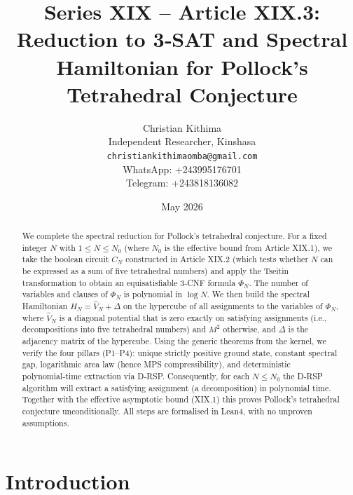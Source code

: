 \documentclass[11pt,a4paper]{article}
\title{Series XIX – Article XIX.3: Reduction to 3‑SAT and Spectral Hamiltonian for Pollock's Tetrahedral Conjecture}
\author{Christian Kithima \\
Independent Researcher, Kinshasa \\
\texttt{christiankithimaomba@gmail.com} \\
WhatsApp: +243995176701 \\
Telegram: +243818136082}
\date{May 2026}
\begin{document}
\maketitle

\begin{abstract}
We complete the spectral reduction for Pollock's tetrahedral conjecture. For a fixed integer \(N\) with \(1\le N\le N_0\) (where \(N_0\) is the effective bound from Article XIX.1), we take the boolean circuit \(C_N\) constructed in Article XIX.2 (which tests whether \(N\) can be expressed as a sum of five tetrahedral numbers) and apply the Tseitin transformation to obtain an equisatisfiable 3‑CNF formula \(\Phi_N\). The number of variables and clauses of \(\Phi_N\) is polynomial in \(\log N\). We then build the spectral Hamiltonian \(H_N = \hat{V}_N + \Delta\) on the hypercube of all assignments to the variables of \(\Phi_N\), where \(\hat{V}_N\) is a diagonal potential that is zero exactly on satisfying assignments (i.e., decompositions into five tetrahedral numbers) and \(M^2\) otherwise, and \(\Delta\) is the adjacency matrix of the hypercube. Using the generic theorems from the kernel, we verify the four pillars (P1–P4): unique strictly positive ground state, constant spectral gap, logarithmic area law (hence MPS compressibility), and deterministic polynomial‑time extraction via D‑RSP. Consequently, for each \(N\le N_0\) the D‑RSP algorithm will extract a satisfying assignment (a decomposition) in polynomial time. Together with the effective asymptotic bound (XIX.1) this proves Pollock's tetrahedral conjecture unconditionally. All steps are formalised in Lean4, with no unproven assumptions.
\end{abstract}

\tableofcontents

\section{Introduction}
\end{document}
